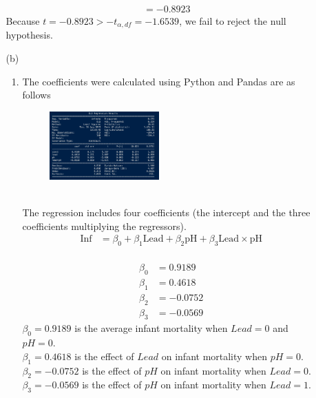 \documentclass{uofa-eng-assignment}
\begin{document}
\begin{enumerate}
\begin{enumerate}
\begin{align*}
                      & = -0.8923
                \end{align*}
                Because $t = -0.8923 > -t_{\alpha, df} = -1.6539$, we fail to reject the null hypothesis.
            \item[(b)]
                \begin{enumerate}
                    \item The coefficients were calculated using Python and Pandas are as follows
                          \begin{figure}[h]
                              \centering
                              \includegraphics[width=0.45\textwidth]{p1-b-i.png}
                          \end{figure} \\
                          The regression includes four coefficients (the intercept and the three
                          coefficients multiplying the regressors).
                          \begin{align*}
                              \text{Inf} & = \beta_0 + \beta_1\text{Lead} + \beta_2\text{pH} + \beta_3\text{Lead}\times\text{pH} \\
                          \end{align*}

                          \begin{align*}
                              \beta_0 & = 0.9189  \\
                              \beta_1 & = 0.4618  \\
                              \beta_2 & = -0.0752 \\
                              \beta_3 & = -0.0569
                          \end{align*}
                          $\beta_0 = 0.9189$ is the average infant mortality when $Lead = 0$ and $pH = 0$. \\
                          $\beta_1 = 0.4618$ is the effect of $Lead$ on infant mortality when $pH = 0$. \\
                          $\beta_2 = -0.0752$ is the effect of $pH$ on infant mortality when $Lead = 0$. \\
                          $\beta_3 = -0.0569$ is the effect of $pH$ on infant mortality when $Lead = 1$. \\


\end{enumerate}
\end{enumerate}
\end{enumerate}
\end{document}
